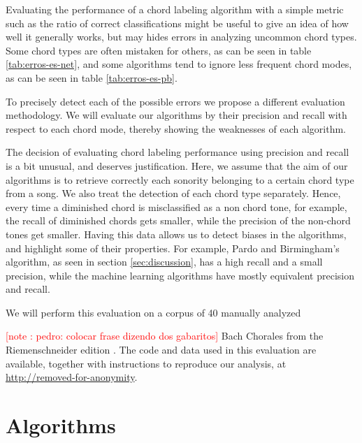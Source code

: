 \documentclass{article}
\newcounter{notecounter}
\newcommand{\note}[1]{
  \addtocounter{notecounter}{1}
  \textcolor{red}{[note \arabic{notecounter}: #1]}
}
\begin{document}
Evaluating the performance of a chord labeling algorithm with a simple
metric such as the ratio of correct classifications might be useful to
give an idea of how well it generally works, but may hides errors in
analyzing uncommon chord types. Some chord types are often mistaken
for others, as can be seen in table \ref{tab:erros-es-net}, and some
algorithms tend to ignore less frequent chord modes, as can be seen in
table \ref{tab:erros-es-pb}.

To precisely detect each of the possible errors we propose a different
evaluation methodology. We will evaluate our algorithms by their
precision and recall with respect to each chord mode, thereby showing
the weaknesses of each algorithm.

The decision of evaluating chord labeling performance using precision
and recall is a bit unusual, and deserves justification. Here, we
assume that the aim of our algorithms is to retrieve correctly each
sonority belonging to a certain chord type from a song. We also treat
the detection of each chord type separately. Hence, every time a
diminished chord is misclassified as a non chord tone, for example,
the recall of diminished chords gets smaller, while the precision of
the non-chord tones get smaller. Having this data allows us to detect
biases in the algorithms, and highlight some of their properties. For
example, Pardo and Birmingham's algorithm, as seen in section
\ref{sec:discussion}, has a high recall and a small precision, while
the machine learning algorithms have mostly equivalent precision and
recall.

We will perform this evaluation on a corpus of 40 manually analyzed
\note{pedro: colocar frase dizendo dos gabaritos} Bach Chorales from
the Riemenschneider edition \cite{gauldin97:harmonic}. The code and data used in
this evaluation are available, together with instructions to reproduce
our analysis, at \url{http://removed-for-anonymity}.

\section{Algorithms}
\label{sec:algorithms}
\end{document}
